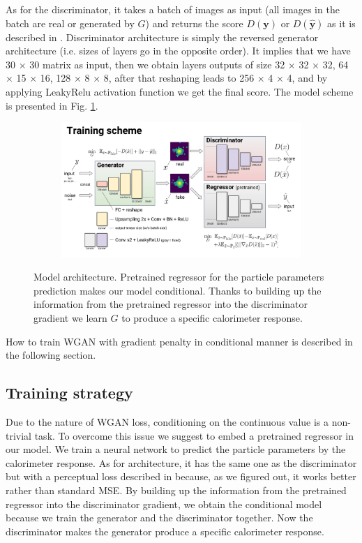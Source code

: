 \documentclass{webofc}
\begin{document}
As for the discriminator, it takes a batch of images as input (all images in the batch are real or generated by $G$) and returns the score $D(\textbf{y})$ or $D(\hat{\textbf{y}})$ as it is described in \cite{arjovsky2017wasserstein}. Discriminator architecture is simply the reversed generator architecture (i.e. sizes of layers go in the opposite order). It implies that we have 30 $\times$ 30 matrix as input, then we obtain layers outputs of size 32 $\times$ 32 $\times$ 32, 64 $\times$ 15 $\times$ 16, 128 $\times$ 8 $\times$  8, after that reshaping leads to 256 $\times$ 4 $\times$ 4, and by applying LeakyRelu activation function we get the final score. The model scheme is presented in Fig. \ref{fig2:model}.

\begin{figure}[h!]
\centering
\begin{subfigure}
  \centering
  \includegraphics[width=0.7\linewidth]{figures/model_architecture.pdf}
\end{subfigure}%
\caption{Model architecture. Pretrained regressor for the particle parameters prediction makes our model conditional. Thanks to building up the information from the pretrained regressor into the discriminator gradient we learn $G$ to produce a specific calorimeter response.}
\label{fig2:model}
\end{figure}

How to train WGAN with gradient penalty in conditional manner is described in the following section.

\subsection{Training strategy} \label{training_strategy}
Due to the nature of WGAN loss, conditioning on the continuous value is a non-trivial task. To overcome this issue we suggest to embed a pretrained regressor in our model. We train a neural network to predict the particle parameters by the calorimeter response. As for architecture, it has the same one as the discriminator but with a perceptual loss described in \cite{johnson2016perceptual} because, as we figured out, it works better rather than standard MSE. By building up the information from the pretrained regressor into the discriminator gradient, we obtain the conditional model because we train the generator and the discriminator together. Now the discriminator makes the generator produce a specific calorimeter response.
\end{document}
